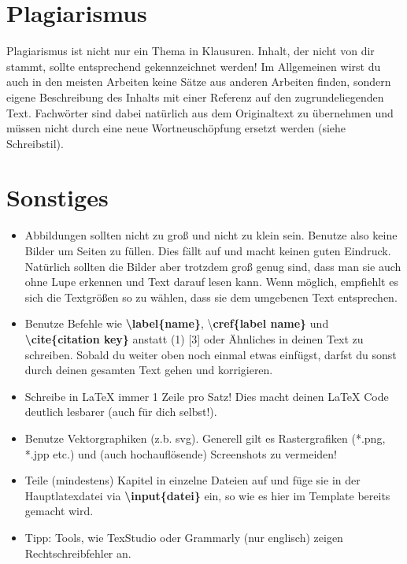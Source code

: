 \section{Plagiarismus}
Plagiarismus ist nicht nur ein Thema in Klausuren. 
Inhalt, der nicht von dir stammt, sollte entsprechend gekennzeichnet werden! 
Im Allgemeinen wirst du auch in den meisten Arbeiten keine Sätze aus anderen Arbeiten finden, sondern eigene Beschreibung des Inhalts mit einer Referenz auf den zugrundeliegenden Text. 
Fachwörter sind dabei natürlich aus dem Originaltext zu übernehmen und müssen nicht durch eine neue Wortneuschöpfung ersetzt werden (siehe Schreibstil).

\section{Sonstiges}
\begin{itemize}
	\item Abbildungen sollten nicht zu groß und nicht zu klein sein. Benutze also keine Bilder um Seiten zu füllen. Dies fällt auf und macht keinen guten Eindruck. Natürlich sollten die Bilder aber trotzdem groß genug sind, dass man sie auch ohne Lupe erkennen und Text darauf lesen kann. Wenn möglich, empfiehlt es sich die Textgrößen so zu wählen, dass sie dem umgebenen Text entsprechen.
	
	\item Benutze Befehle wie \textbf{\textbackslash label\{name\}}, \textbackslash \textbf{cref\{label name\}} und \textbf{\textbackslash cite\{citation key\}} anstatt (1) [3] oder Ähnliches in deinen Text zu schreiben. Sobald du weiter oben noch einmal etwas einfügst, darfst du sonst durch deinen gesamten Text gehen und korrigieren.
	
	\item Schreibe in LaTeX immer 1 Zeile pro Satz! Dies macht deinen LaTeX Code deutlich lesbarer (auch für dich selbst!).
	
	\item Benutze Vektorgraphiken (z.b. svg). Generell gilt es Rastergrafiken (*.png, *.jpp etc.) und (auch hochauflösende) Screenshots zu vermeiden!
	
	\item Teile (mindestens) Kapitel in einzelne Dateien auf und füge sie in der Hauptlatexdatei via \textbf{\textbackslash input\{datei\}} ein, so wie es hier im Template bereits gemacht wird.
	
	\item Tipp: Tools, wie TexStudio oder Grammarly (nur englisch) zeigen Rechtschreibfehler an.
\end{itemize}